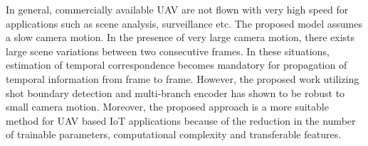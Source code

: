 \documentclass[journal]{IEEEtran}
\begin{document}
In general, commercially available UAV are not flown with very high speed for applications such as scene analysis, surveillance etc.  The proposed model assumes a slow camera motion. In the presence of very large camera motion, there exists large scene variations between two consecutive frames. In these situations, estimation of temporal correspondence becomes mandatory for propagation of temporal information from frame to frame. However, the proposed work utilizing shot boundary detection and multi-branch encoder has shown to be robust to small camera motion. Moreover, the proposed approach is a more suitable method for UAV based IoT applications because of the reduction in the number of trainable parameters, computational complexity and transferable features.




































{\small
	
	
}



\vfill
\end{document}
